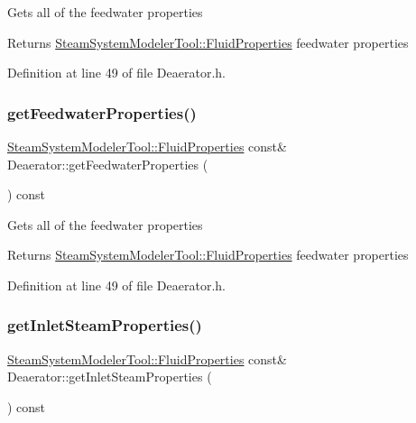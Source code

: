 Gets all of the feedwater properties \begin{DoxyReturn}{Returns}
\hyperlink{struct_steam_system_modeler_tool_1_1_fluid_properties}{Steam\+System\+Modeler\+Tool\+::\+Fluid\+Properties} feedwater properties 
\end{DoxyReturn}


Definition at line 49 of file Deaerator.\+h.

\mbox{\label{class_deaerator_ab2ab900e36c86e48ad92c4013c471d6b}} 
\subsubsection{\texorpdfstring{get\+Feedwater\+Properties()}{getFeedwaterProperties()}\hspace{0.1cm}{\footnotesize\ttfamily [3/3]}}
{\footnotesize\ttfamily \hyperlink{struct_steam_system_modeler_tool_1_1_fluid_properties}{Steam\+System\+Modeler\+Tool\+::\+Fluid\+Properties} const\& Deaerator\+::get\+Feedwater\+Properties (\begin{DoxyParamCaption}{ }\end{DoxyParamCaption}) const\hspace{0.3cm}{\ttfamily [inline]}}

Gets all of the feedwater properties \begin{DoxyReturn}{Returns}
\hyperlink{struct_steam_system_modeler_tool_1_1_fluid_properties}{Steam\+System\+Modeler\+Tool\+::\+Fluid\+Properties} feedwater properties 
\end{DoxyReturn}


Definition at line 49 of file Deaerator.\+h.

\mbox{\label{class_deaerator_a7298fa1e4930e73dd5340411e8ccff33}} 
\subsubsection{\texorpdfstring{get\+Inlet\+Steam\+Properties()}{getInletSteamProperties()}\hspace{0.1cm}{\footnotesize\ttfamily [1/3]}}
{\footnotesize\ttfamily \hyperlink{struct_steam_system_modeler_tool_1_1_fluid_properties}{Steam\+System\+Modeler\+Tool\+::\+Fluid\+Properties} const\& Deaerator\+::get\+Inlet\+Steam\+Properties (\begin{DoxyParamCaption}{ }\end{DoxyParamCaption}) const\hspace{0.3cm}{\ttfamily [inline]}}

